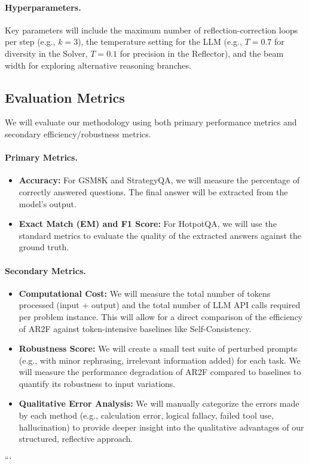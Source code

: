 \documentclass{article}
\begin{document}
\paragraph{Hyperparameters.} Key parameters will include the maximum number of reflection-correction loops per step (e.g., $k=3$), the temperature setting for the LLM (e.g., $T=0.7$ for diversity in the Solver, $T=0.1$ for precision in the Reflector), and the beam width for exploring alternative reasoning branches.

\subsection{Evaluation Metrics}
We will evaluate our methodology using both primary performance metrics and secondary efficiency/robustness metrics.

\paragraph{Primary Metrics.}
\begin{itemize}
    \item \textbf{Accuracy:} For GSM8K and StrategyQA, we will measure the percentage of correctly answered questions. The final answer will be extracted from the model's output.
    \item \textbf{Exact Match (EM) and F1 Score:} For HotpotQA, we will use the standard metrics to evaluate the quality of the extracted answers against the ground truth.
\end{itemize}

\paragraph{Secondary Metrics.}
\begin{itemize}
    \item \textbf{Computational Cost:} We will measure the total number of tokens processed (input + output) and the total number of LLM API calls required per problem instance. This will allow for a direct comparison of the efficiency of AR2F against token-intensive baselines like Self-Consistency.
    \item \textbf{Robustness Score:} We will create a small test suite of perturbed prompts (e.g., with minor rephrasing, irrelevant information added) for each task. We will measure the performance degradation of AR2F compared to baselines to quantify its robustness to input variations.
    \item \textbf{Qualitative Error Analysis:} We will manually categorize the errors made by each method (e.g., calculation error, logical fallacy, failed tool use, hallucination) to provide deeper insight into the qualitative advantages of our structured, reflective approach.
\end{itemize}
```
\end{document}
